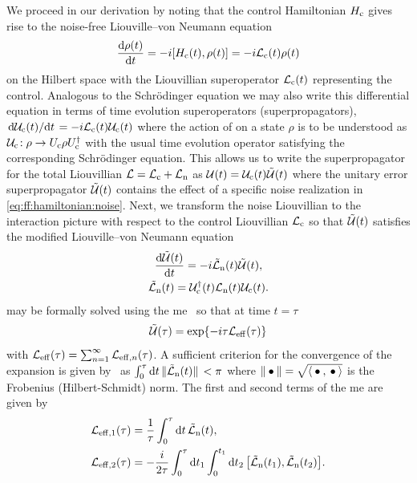 We proceed in our derivation by noting that the control Hamiltonian $H_{\mathrm{c}}$ gives rise to the noise-free Liouville--von Neumann equation
\begin{equation}\label{eq:liouville-von-neumann}
    \dv{\rho(t)}{t} = -\i\comm{\Hc(t)}{\rho(t)} =  -\i\Lc(t)\rho(t)
\end{equation}
on the Hilbert space \Hspace with the Liouvillian superoperator $\mathcal{L}_{\mathrm{c}}(t)$ representing the control.
Analogous to the Schrödinger equation we may also write this differential equation in terms of time evolution superoperators (superpropagators), $\dv*{\mathcal{U}_{\mathrm{c}}(t)}{t} = -i\mathcal{L}_{\mathrm{c}}(t)\mathcal{U}_{\mathrm{c}}(t)$ where the action of \liouvUc on a state $\rho$ is to be understood as $\mathcal{U}_{\mathrm{c}}\!: \rho\rightarrow U_{\mathrm{c}}\rho U_{\mathrm{c}}^\dagger$ with \Uc the usual time evolution operator satisfying the corresponding Schrödinger equation.
This allows us to write the superpropagator for the total Liouvillian $\mathcal{L} = \mathcal{L}_{\mathrm{c}} + \mathcal{L}_{\mathrm{n}}$ as $\mathcal{U}(t) = \mathcal{U}_{\mathrm{c}}(t)\mathcal{\tilde{U}}(t)$ where the unitary error superpropagator $\mathcal{\tilde{U}}(t)$ contains the effect of a specific noise realization in \cref{eq:ff:hamiltonian:noise}.
Next, we transform the noise Liouvillian \Ln to the interaction picture with respect to the control Liouvillian $\mathcal{L}_{\mathrm{c}}$ so that $\mathcal{\tilde{U}}(t)$ satisfies the modified Liouville--von Neumann equation
\begin{gather}
    \dv{\liouvUe(t)}{t} = -\i\Lnt(t)\liouvUe(t),    \label{eq:ff:le:interaction_picture} \\
    \Lnt(t) = \liouvUc^\dagger(t)\Ln(t)\liouvUc(t). \label{eq:ff:liouvillian:interaction_picture}
\end{gather}
 may be formally solved using the \acrlong{me}~\cite{Magnus1954} so that at time $t=\tau$
\begin{equation}\label{eq:ff:error_propagator}
    \mathcal{\tilde{U}}(\tau) = \exp\lbrace -i\tau\mathcal{L}_{\mathrm{eff}}(\tau)\rbrace
\end{equation}
with $\mathcal{L}_{\mathrm{eff}}(\tau) = \sum_{n=1}^\infty\mathcal{L}_{\mathrm{eff},n}(\tau)$.
A sufficient criterion for the convergence of the expansion is given by~\citet{Moan1999} as $\int_0^\tau\dd{t}\norm*{\tilde{\mathcal{L}}_{\mathrm{n}}(t)} < \pi$ where $\norm{\:\bullet\:} = \sqrt{\expval{\:\bullet\:,\:\bullet\:}}$ is the Frobenius (Hilbert-Schmidt) norm.
The first and second terms of the \gls{me} are given by~\cite{Magnus1954,Blanes2009}
\begin{subequations}\label{eq:ff:magnus_expansion}
\begin{align}
    \Li_\mr{eff,1}(\tau) &= \frac{1}{\tau}\int_0^\tau\dd{t}\Lnt(t), \label{eq:ff:magnus_expansion:1}\\
    \Li_\mr{eff,2}(\tau) &= -\frac{\i}{2\tau}\int_0^\tau\dd{t_1}\int_0^{t_1}\dd{t_2}\comm{\Lnt(t_1)}{\Lnt(t_2)}. \label{eq:ff:magnus_expansion:2}
\end{align}
\end{subequations}
